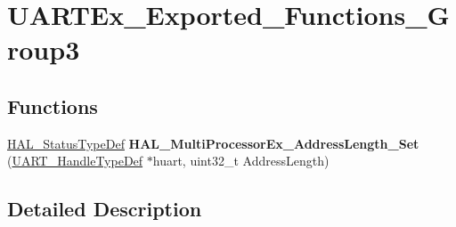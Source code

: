 \hypertarget{group___u_a_r_t_ex___exported___functions___group3}{}\section{U\+A\+R\+T\+Ex\+\_\+\+Exported\+\_\+\+Functions\+\_\+\+Group3}
\label{group___u_a_r_t_ex___exported___functions___group3}
\subsection*{Functions}
\begin{DoxyCompactItemize}
\item 
\mbox{\label{group___u_a_r_t_ex___exported___functions___group3_gabb9d4edfed47241a86a304856cb4e3c6}} 
\mbox{\hyperlink{stm32f7xx__hal__def_8h_a63c0679d1cb8b8c684fbb0632743478f}{H\+A\+L\+\_\+\+Status\+Type\+Def}} {\bfseries H\+A\+L\+\_\+\+Multi\+Processor\+Ex\+\_\+\+Address\+Length\+\_\+\+Set} (\mbox{\hyperlink{group___u_a_r_t___exported___types_ga7adf4f3e4c3ecde572be5925c915a967}{U\+A\+R\+T\+\_\+\+Handle\+Type\+Def}} $\ast$huart, uint32\+\_\+t Address\+Length)
\end{DoxyCompactItemize}


\subsection{Detailed Description}
